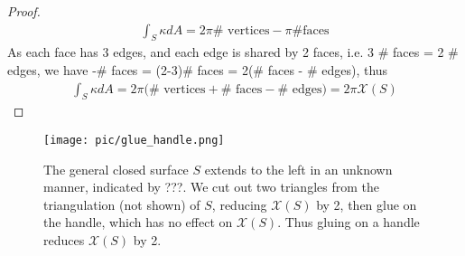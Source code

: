 \documentclass[10pt]{article}
\begin{document}
\begin{proof}
\begin{equation*}
\begin{aligned}
                        \int_S\kappa dA = 2\pi \#\text{ vertices}  - \pi \#\text{faces}
                    \end{aligned}
                \end{equation*}
                As each face has 3 edges, and each edge is shared by 2 faces, i.e. 3 \# faces = 2 \# edges, we have -\# faces = (2-3)\# faces = 2(\# faces - \# edges), thus
                \begin{equation*}
                    \begin{aligned}
                        \int_S\kappa dA = 2\pi\big( \#\text{ vertices} + \#\text{ faces} - \#\text{ edges} \big) = 2\pi\mathcal{X}(S)
                    \end{aligned}
                \end{equation*}
            \end{proof}
            \begin{figure}[H]
                \centering
                \texttt{[image: pic/glue\_handle.png]}
                \caption{The general closed surface $S$ extends to the left in an unknown manner, indicated by ???. We cut out two triangles from the triangulation (not shown) of $S$, reducing $\mathcal{X}(S)$ by 2, then glue on the handle, which has no effect on $\mathcal{X}(S)$. Thus gluing on a handle reduces $\mathcal{X}(S)$ by 2.}
            \end{figure}

                
\end{document}
